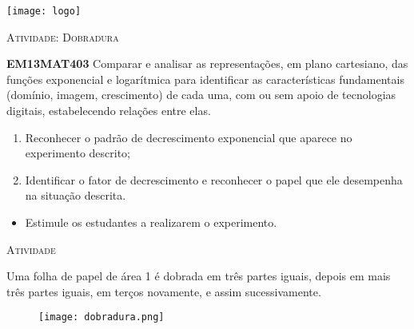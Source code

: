 \documentclass[10 pt,usenames,dvipsnames, oneside]{article}
\begin{document}
\begin{center}
  \begin{minipage}[l]{3cm}
\texttt{[image: logo]}    
\end{minipage}\hfill
\begin{minipage}[r]{.8\textwidth}
 {\Large \scshape Atividade: Dobradura}  
\end{minipage}
\end{center}
\vspace{.2cm}

\ifdefined\prof
\begin{objetivos}
\item \textbf{EM13MAT403} Comparar e analisar as representações, em plano cartesiano, das funções exponencial e logarítmica para identificar as características fundamentais (domínio, imagem, crescimento) de cada uma, com ou sem apoio de tecnologias digitais, estabelecendo relações entre elas.
\end{objetivos}

\begin{goals}
\begin{enumerate}
	\item Reconhecer o padrão de decrescimento exponencial que aparece no experimento descrito;
	\item Identificar o fator de decrescimento e reconhecer o papel que ele desempenha na situação descrita.
\end{enumerate}

\tcblower

\begin{itemize}
	\item Estimule os estudantes a realizarem o experimento.
\end{itemize}
\end{goals}

\bigskip
\begin{center}
{\large \scshape Atividade}
\end{center}
\fi

Uma folha de papel de área 1 é dobrada em três partes iguais, depois em mais três partes iguais, em terços novamente, e assim sucessivamente.

\begin{figure}[H]
\centering
\texttt{[image: dobradura.png]}
\end{figure}
\end{document}
